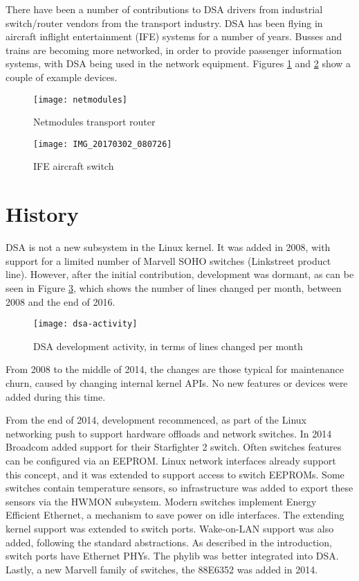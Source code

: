 \documentclass[letterpaper]{article}
\begin{document}
There have been a number of contributions to DSA drivers from
industrial switch/router vendors from the transport industry. DSA has
been flying in aircraft inflight entertainment (IFE) systems for a
number of years. Busses and trains are becoming more networked, in
order to provide passenger information systems, with DSA being used in
the network equipment. Figures \ref{netmodules} and \ref{ife} show a
couple of example devices.

\begin{figure}[ht]
  \centering
  \texttt{[image: netmodules]}
  \caption{Netmodules transport router}
  \label{netmodules}
\end{figure}

\begin{figure}[ht]
  \centering
  \texttt{[image: IMG\_20170302\_080726]}
  \caption{IFE aircraft switch}
  \label{ife}
\end{figure}

\section{History}

DSA is not a new subsystem in the Linux kernel. It was added in 2008,
with support for a limited number of Marvell SOHO switches (Linkstreet
product line). However, after the initial contribution, development
was dormant, as can be seen in Figure \ref{dsa-activity}, which shows
the number of lines changed per month, between 2008 and the end of
2016.

\begin{figure}[ht]
  \centering
  \texttt{[image: dsa-activity]}
  \caption{DSA development activity, in terms of lines changed per
    month}
  \label{dsa-activity}
\end{figure}

From 2008 to the middle of 2014, the changes are those typical for
maintenance churn, caused by changing internal kernel APIs. No new
features or devices were added during this time.

From the end of 2014, development recommenced, as part of the Linux
networking push to support hardware offloads and network switches. In
2014 Broadcom added support for their Starfighter 2 switch. Often
switches features can be configured via an EEPROM. Linux network
interfaces already support this concept, and it was extended to
support access to switch EEPROMs. Some switches contain temperature
sensors, so infrastructure was added to export these sensors via the
HWMON subsystem. Modern switches implement Energy Efficient Ethernet,
a mechanism to save power on idle interfaces. The extending kernel
support was extended to switch ports. Wake-on-LAN support was also
added, following the standard abstractions. As described in the
introduction, switch ports have Ethernet PHYs. The phylib was better
integrated into DSA. Lastly, a new Marvell family of switches, the
88E6352 was added in 2014.
\end{document}
